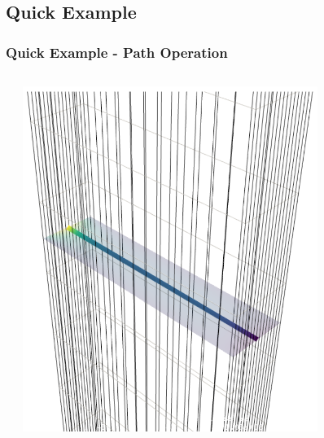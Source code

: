 \documentclass[t]{beamer}
\begin{document}
\subsection{Quick Example}
\begin{frame}
  \frametitle{Quick Example - Path Operation}

  \begin{columns}[T]
    \begin{column}{.5\textwidth}
      \vspace{-15pt}
      \inputminted[fontsize=\footnotesize]{python}{code/path_op.py}
    \end{column}

    \begin{column}{.5\textwidth}
      \vspace{-15pt}
      \centering
      \includegraphics[width=0.75\textwidth]{figures/path_op.png}
    \end{column}
  \end{columns}

\end{frame}
\end{document}
